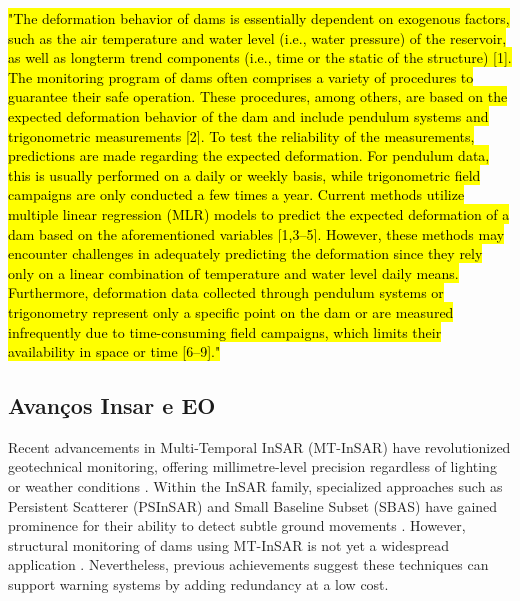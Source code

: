 \documentclass[11pt,a4paper]{article}
\begin{document}
\hl{\mbox{\parencite{ziemer2025}} "The deformation behavior of dams is essentially dependent on exogenous factors, such as the air temperature and water level (i.e., water pressure) of the reservoir, as well as longterm trend components (i.e., time or the static of the structure) [1]. The monitoring program of dams often comprises a variety of procedures to guarantee their safe operation. These procedures, among others, are based on the expected deformation behavior of the dam and include pendulum systems and trigonometric measurements [2]. To test the reliability of the measurements, predictions are made regarding the expected deformation. For pendulum data, this is usually performed on a daily or weekly basis, while trigonometric field campaigns are only conducted a few times a year. Current methods utilize multiple linear regression (MLR) models to predict the expected deformation of a dam based on the aforementioned variables [1,3–5]. However, these methods may encounter challenges in adequately predicting the deformation since they rely only on a linear combination of temperature and water level daily means. Furthermore, deformation data collected through pendulum systems or trigonometry represent only a specific point on the dam or are measured infrequently due to time-consuming field campaigns, which limits their availability in space or time [6–9]."}


\subsection{Avanços Insar e EO}

Recent advancements in Multi-Temporal InSAR (MT-InSAR) have revolutionized geotechnical monitoring, offering millimetre-level precision regardless of lighting or weather conditions \parencite{xie2022, cernuto2026}. Within the InSAR family, specialized approaches such as Persistent Scatterer (PSInSAR) and Small Baseline Subset (SBAS) have gained prominence for their ability to detect subtle ground movements \parencite{hariri-ardebiliAdvancesDamEngineering2020}. However, structural monitoring of dams using MT-InSAR is not yet a widespread application \parencite{ruiz-armenteros2018}. Nevertheless, previous achievements suggest these techniques can support warning systems by adding redundancy at a low cost.
\end{document}
